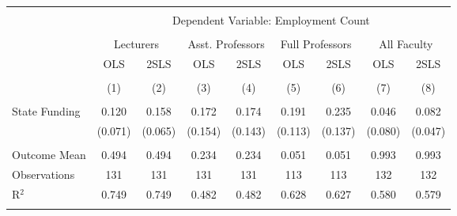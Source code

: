 
\begin{tabular}{@{\extracolsep{5pt}}lcccccccc} 
\\[-1.8ex]\hline 
\hline \\[-1.8ex] 
 & \multicolumn{8}{c}{Dependent Variable: Employment Count} \\ 
\cline{2-9} 
\\[-1.8ex] & \multicolumn{2}{c}{Lecturers} & \multicolumn{2}{c}{Asst. Professors} & \multicolumn{2}{c}{Full Professors} & \multicolumn{2}{c}{All Faculty} \\ 
 & OLS & 2SLS & OLS & 2SLS & OLS & 2SLS & OLS & 2SLS \\ 
\\[-1.8ex] & (1) & (2) & (3) & (4) & (5) & (6) & (7) & (8)\\ 
\hline \\[-1.8ex] 
 State Funding & 0.120 & 0.158 & 0.172 & 0.174 & 0.191 & 0.235 & 0.046 & 0.082 \\ 
  & (0.071) & (0.065) & (0.154) & (0.143) & (0.113) & (0.137) & (0.080) & (0.047) \\ 
 \hline \\[-1.8ex] 
Outcome Mean & 0.494 & 0.494 & 0.234 & 0.234 & 0.051 & 0.051 & 0.993 & 0.993 \\ 
Observations & 131 & 131 & 131 & 131 & 113 & 113 & 132 & 132 \\ 
R$^{2}$ & 0.749 & 0.749 & 0.482 & 0.482 & 0.628 & 0.627 & 0.580 & 0.579 \\ 
\hline 
\hline \\[-1.8ex] 
\end{tabular} 
